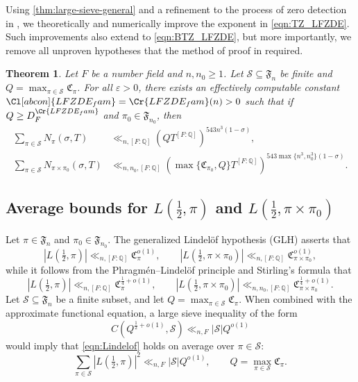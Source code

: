 \documentclass[11pt]{amsart}
\newtheorem{theorem}{Theorem}[section]
\theoremstyle{remark}
\numberwithin{equation}{section}
\newcommand{\Q}{\mathbb{Q}}
\newcommand{\mS}{\mathcal{S}}
\renewcommand{\epsilon}{\varepsilon}
\begin{document}
Using \cref{thm:large-sieve-general} and a refinement to the process of zero detection in \cite{BrumleyThornerZaman,TZ_GLn}, we theoretically and numerically improve the exponent in \eqref{eqn:TZ_LFZDE}.  Such improvements also extend to \eqref{eqn:BTZ_LFZDE}, but more importantly, we remove all unproven hypotheses that the method of proof in \cite{BrumleyThornerZaman} required.
\begin{theorem}
\label{thm:LFZDE}
Let $F$ be a number field and $n,n_0\geq 1$.  Let $\mathcal{S}\subseteq\mathfrak{F}_n$ be finite and $Q=\max_{\pi\in\mathcal{S}}\mathfrak{C}_{\pi}$.  For all $\epsilon>0$, there exists an effectively computable constant $\Cl[abcon]{LFZDE_fam}=\Cr{LFZDE_fam}(n)>0$ such that if $Q\geq D_F^{\Cr{LFZDE_fam}}$ and $\pi_0\in\mathfrak{F}_{n_0}$, then
\begin{align*}
\sum_{\pi\in\mathcal{S}}N_{\pi}(\sigma,T)&\ll_{n,[F:\Q]}(QT^{[F:\Q]})^{543 n^3(1-\sigma)},\\
\sum_{\pi\in\mathcal{S}}N_{\pi\times\pi_0}(\sigma,T)&\ll_{n,n_0,[F:\Q]}(\max\{\mathfrak{C}_{\pi_0},Q\}T^{[F:\Q]})^{543\max\{n^3,n_0^3\}(1-\sigma)}.
\end{align*}
\end{theorem}


\subsection{Average bounds for $L(\frac{1}{2},\pi)$ and $L(\frac{1}{2},\pi\times\pi_0)$}

Let $\pi\in\mathfrak{F}_n$ and $\pi_0\in\mathfrak{F}_{n_0}$.  The generalized Lindel{\"o}f hypothesis (GLH) asserts that
\begin{equation}
\label{eqn:Lindelof}
|L(\tfrac{1}{2},\pi)|\ll_{n,[F:\Q]}\mathfrak{C}_{\pi}^{o(1)},\qquad |L(\tfrac{1}{2},\pi\times\pi_0)|\ll_{n,[F:\Q]}\mathfrak{C}_{\pi\times\pi_0}^{o(1)},
\end{equation}
while it follows from the Phragm{\'e}n--Lindel{\"o}f principle and Stirling's formula that
\begin{equation}
\label{eqn:convexity}
|L(\tfrac{1}{2},\pi)|\ll_{n,[F:\Q]}\mathfrak{C}_{\pi}^{\frac{1}{4}+o(1)},\qquad 
|L(\tfrac{1}{2},\pi\times\pi_0)|\ll_{n,n_0,[F:\Q]}\mathfrak{C}_{\pi\times\pi_0}^{\frac{1}{4}+o(1)}.
\end{equation}
Let $\mathcal{S}\subseteq\mathfrak{F}_n$ be a finite subset, and let $Q=\max_{\pi\in\mathcal{S}}\mathfrak{C}_{\pi}$. When combined with the approximate functional equation, a large sieve inequality of the form
\begin{equation}
\label{eqn:AFE_large_sieve}
C(Q^{\frac{1}{2}+o(1)},\mathcal{S})\ll_{n,F} |\mathcal{S}| Q^{o(1)}
\end{equation}
would imply that \eqref{eqn:Lindelof} holds on average over $\pi \in \mS$:
\begin{equation}
\label{eqn:ideal_2nd_moment}
\sum_{\pi\in\mathcal{S}}|L(\tfrac{1}{2},\pi)|^2\ll_{n,F} |\mS| Q^{o(1)},\qquad Q=\max_{\pi\in\mathcal{S}}\mathfrak{C}_{\pi}.
\end{equation}
\end{document}
